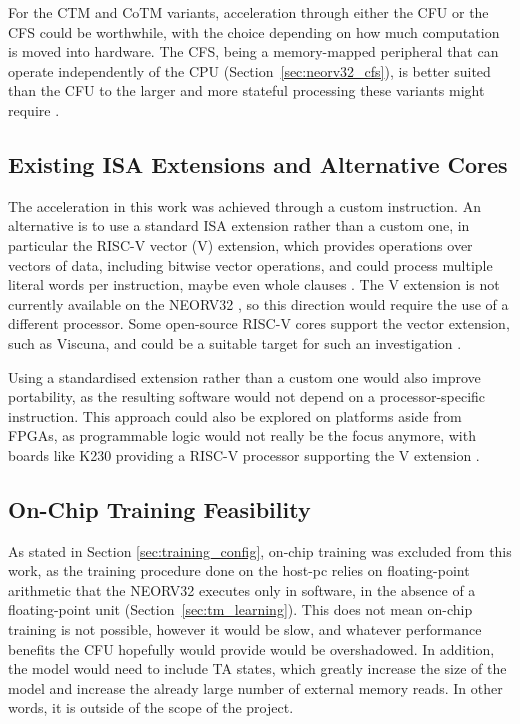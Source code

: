 For the CTM and CoTM variants, acceleration through either the CFU or the CFS could be worthwhile, with the choice depending on how much computation is moved into hardware. The CFS, being a memory-mapped peripheral that can operate independently of the CPU (Section~\ref{sec:neorv32_cfs}), is better suited than the CFU to the larger and more stateful processing these variants might require \cite{Nolting2024Datasheet}.

\subsection{Existing ISA Extensions and Alternative Cores}
\label{sec:disc_vector}

The acceleration in this work was achieved through a custom instruction. An alternative is to use a standard ISA extension rather than a custom one, in particular the RISC-V vector (V) extension, which provides operations over vectors of data, including bitwise vector operations, and could process multiple literal words per instruction, maybe even whole clauses \cite{riscv_unpriv_isa}. The V extension is not currently available on the NEORV32 \cite{Nolting2024Datasheet}, so this direction would require the use of a different processor. Some open-source RISC-V cores support the vector extension, such as Viscuna, and could be a suitable target for such an investigation \cite{platzer2021vicuna}. 

Using a standardised extension rather than a custom one would also improve portability, as the resulting software would not depend on a processor-specific instruction. This approach could also be explored on platforms aside from FPGAs, as programmable logic would not really be the focus anymore, with boards like K230 providing a RISC-V processor supporting the V extension \cite{canaan_k230_datasheet}.

\subsection{On-Chip Training Feasibility}
\label{sec:disc_training}

As stated in Section \ref{sec:training_config}, on-chip training was excluded from this work, as the training procedure done on the host-pc relies on floating-point arithmetic that the NEORV32 executes only in software, in the absence of a floating-point unit (Section~\ref{sec:tm_learning}). This does not mean on-chip training is not possible, however it would be slow, and whatever performance benefits the CFU hopefully would provide would be overshadowed. In addition, the model would need to include TA states, which greatly increase the size of the model and increase the already large number of external memory reads. In other words, it is outside of the scope of the project.

